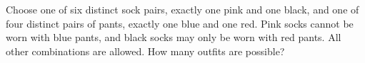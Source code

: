 Choose one of six distinct sock pairs, exactly one pink and one black, and one of four distinct pairs of pants, exactly one blue and one red. Pink socks cannot be worn with blue pants, and black socks may only be worn with red pants. All other combinations are allowed. How many outfits are possible?
